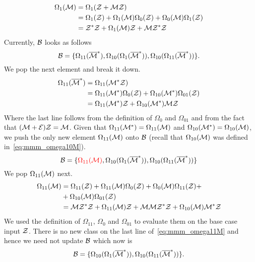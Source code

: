 \documentclass[12pt, a4paper, twoside]{report}
\begin{document}
\begin{align}
  \begin{aligned}
    \Omega_1(\mathcal{M}) &= \Omega_1(\mathcal{Z} + \mathcal{M}\mathcal{Z})\\
    &= \Omega_1(\mathcal{Z}) + \Omega_1(\mathcal{M})\Omega_0(\mathcal{Z}) + \Omega_0(\mathcal{M})\Omega_1(\mathcal{Z})\\
    &= \mathcal{Z}^*\mathcal{Z} + \Omega_1(\mathcal{M})\mathcal{Z} + \mathcal{M}\mathcal{Z}^*\mathcal{Z}
  \end{aligned}
\end{align}
Currently, $\mathcal{B}$ looks as follows
$$\mathcal{B} = \{\Omega_{11}(\overline{\mathcal{M}}^*), \Omega_{10}(\Omega_1(\overline{\mathcal{M}}^*)), \Omega_{10}(\Omega_{11}(\overline{\mathcal{M}}^*))\}.$$
We pop the next element and break it down.
\begin{align}
  \begin{aligned}
    \Omega_{11}(\overline{\mathcal{M}}^*) &= \Omega_{11}(\mathcal{M}^*\mathcal{Z})\\
    &= \Omega_{11}(\mathcal{M}^*)\Omega_0(\mathcal{Z}) + \Omega_{10}(\mathcal{M}^*)\Omega_{01}(\mathcal{Z})\\
    &= \Omega_{11}(\mathcal{M}^*)\mathcal{Z} + \Omega_{10}(\mathcal{M}^*)\mathcal{M}\mathcal{Z}
  \end{aligned}
\end{align}
Where the last line follows from the definition of $\Omega_{0}$ and $\Omega_{01}$ and from the fact that $(\mathcal{M}+\mathcal{E})\mathcal{Z} = \mathcal{M}$. Given that $\Omega_{11}(\mathcal{M}^*) = \Omega_{11}(\mathcal{M})$ and $\Omega_{10}(\mathcal{M}^*) = \Omega_{10}(\mathcal{M})$, we push the only new element $\Omega_{11}(\mathcal{M})$ onto $\mathcal{B}$ (recall that $\Omega_{10}(\mathcal{M})$ was defined in~\eqref{eq:mmm_omega10M}).
$$\mathcal{B} = \{\textcolor{red}{\Omega_{11}(\mathcal{M})}, \Omega_{10}(\Omega_1(\overline{\mathcal{M}}^*)), \Omega_{10}(\Omega_{11}(\overline{\mathcal{M}}^*))\}$$
We pop $\Omega_{11}(\mathcal{M})$ next.
\begin{align}
  \begin{aligned}
    \Omega_{11}(\mathcal{M}) &= \Omega_{11}(\mathcal{Z}) + \Omega_{11}(\mathcal{M})\Omega_0(\mathcal{Z}) + \Omega_0(\mathcal{M})\Omega_{11}(\mathcal{Z}) +\\
    &+\Omega_{10}(\mathcal{M})\Omega_{01}(\mathcal{Z})\\
    &= \mathcal{M}\mathcal{Z}^*\mathcal{Z} + \Omega_{11}(\mathcal{M})\mathcal{Z} + \mathcal{M}\mathcal{M}\mathcal{Z}^*\mathcal{Z} + \Omega_{10}(\mathcal{M})\mathcal{M}^*\mathcal{Z}
  \end{aligned}
      \label{eq:mmm_omega11M}
\end{align}
We used the definition of $\Omega_{11}$, $\Omega_{0}$ and $\Omega_{01}$ to evaluate them on the base case input $\mathcal{Z}$. There is no new class on the last line of~\eqref{eq:mmm_omega11M} and hence we need not update $\mathcal{B}$ which now is
$$\mathcal{B} = \{\Omega_{10}(\Omega_1(\overline{\mathcal{M}}^*)), \Omega_{10}(\Omega_{11}(\overline{\mathcal{M}}^*))\}.$$
\end{document}
